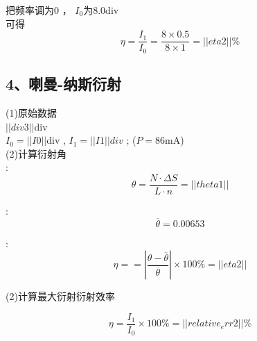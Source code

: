 \indent 把频率调为0 ， ${I}_{0}$为$8.0$div \\

\indent 可得$$\eta = \frac{{I}_{1}}{{I}_{0}} = \frac{8\times0.5}{8\times1} = ||eta2||\% $$
\subsection*{4、喇曼-纳斯衍射}
\indent (1)原始数据\\ 

\indent{}$||div3||$div \\

\indent\indent ${I}_{0} = ||I0||$div , ${I}_{1} = ||I1||div$ ; ($P = 86$mA) \\

\indent (2)计算衍射角 \\

\indent{}:$$\theta = \frac{N\cdot\Delta S}{L\cdot n} = ||theta1||$$ 

\indent{}:$$\overline{\theta} = 0.00653$$ 

\indent{}:$$\eta = = \left | \frac{\theta-\overline{\theta}}{\overline{\theta}} \right | \times100\% = ||eta2|| $$ 

\indent (2)计算最大衍射衍射效率 

\indent $$\eta = \frac{{I}_{1}}{{I}_{0}}\times100\% = ||relative_err2||\% $$ \\
